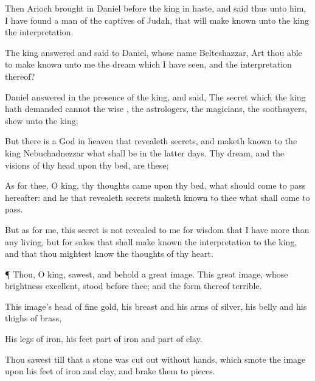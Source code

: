 {Then
Arioch brought
in
Daniel
before the
king in
haste, and
said
thus unto him, I have
found a
man of the
captives
of
Judah, that will make
known unto the
king the
interpretation.

The
king
answered and
said to
Daniel, whose
name
{}
Belteshazzar,
Art thou
able to make
known unto me the
dream which I have
seen, and the
interpretation thereof?

Daniel
answered in the
presence of the
king, and
said, The
secret which the
king hath
demanded
cannot the
wise
{}, the
astrologers, the
magicians, the
soothsayers,
shew unto the
king;

But there
is a
God in
heaven that
revealeth
secrets, and maketh
known to the
king
Nebuchadnezzar
what shall
be in the
latter
days. Thy
dream, and the
visions of thy
head
upon thy
bed, are
these;

As for
thee, O
king, thy
thoughts
came
{}
upon thy
bed,
what should come to
pass
hereafter: and he that
revealeth
secrets maketh
known to thee
what shall come to
pass.

But as for
me,
this
secret is
not
revealed to me for
{}
wisdom that I
have more
than
any
living,
but for
{}
sakes
that shall make
known the
interpretation to the
king, and that thou mightest
know the
thoughts of thy
heart.


\par }{\PP {}¶
Thou, O
king,
sawest, and
behold a
great
image.
This
great
image, whose
brightness
{}
excellent,
stood
before thee; and the
form thereof
{}
terrible.

This
image’s
head
{} of
fine
gold, his
breast and his
arms of
silver, his
belly and his
thighs of
brass,

His
legs of
iron, his
feet
part of
iron and
part of
clay.

Thou
sawest
till that a
stone was cut
out
without
hands, which
smote the
image
upon his
feet
{} of
iron and
clay, and
brake
them to
pieces.

}
